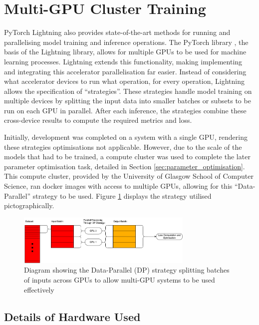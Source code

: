 \documentclass{l4proj}
\begin{document}
\section{Multi-GPU Cluster Training}

PyTorch Lightning also provides state-of-the-art methods for running and parallelising model training and inference operations. The PyTorch library \citep{Paszke_PyTorch_An_Imperative_2019}, the basis of the Lightning library, allows for multiple GPUs to be used for machine learning processes. Lightning extends this functionality, making implementing and integrating this accelerator parallelisation far easier. Instead of considering what accelerator devices to run what operation, for every operation, Lightning allows the specification of “strategies”. These strategies handle model training on multiple devices by splitting the input data into smaller batches or subsets to be run on each GPU in parallel. After each inference, the strategies combine these cross-device results to compute the required metrics and loss.

Initially, development was completed on a system with a single GPU, rendering these strategies optimisations not applicable. However, due to the scale of the models that had to be trained, a compute cluster was used to complete the later parameter optimisation task, detailed in Section \ref{sec:parameter_optimisation}. This compute cluster, provided by the University of Glasgow School of Computer Science, ran docker images with access to multiple GPUs, allowing for this “Data-Parallel” strategy to be used. Figure \ref{fig:data_parallel_diagram} displays the strategy utilised pictographically.

\begin{figure}[htb] 
    \centering

     \includegraphics[width=0.75\textwidth]{images/data_parallel_diagram.png}
     \caption{Diagram showing the Data-Parallel (DP) strategy splitting batches of inputs across GPUs to allow multi-GPU systems to be used effectively}
     \label{fig:data_parallel_diagram}
\end{figure}

\subsection{Details of Hardware Used}
\end{document}
